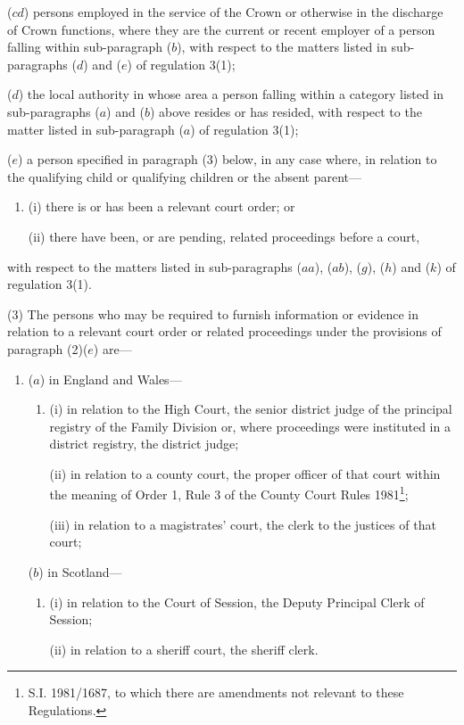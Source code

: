\documentclass[a4paper,12pt]{article}
\begin{document}
\begin{enumerate}
($cd$) persons employed in the service of the Crown or otherwise in the discharge of Crown functions, where they are the current or recent employer of a person falling within sub-paragraph ($b$), with respect to the matters listed in sub-paragraphs ($d$) and ($e$) of regulation 3(1);

($d$) the local authority in whose area a person falling within a category listed in sub-paragraphs ($a$) and ($b$) above resides or has resided, with respect to the matter listed in sub-paragraph ($a$) of regulation 3(1);

($e$) a person specified in paragraph (3) below, in any case where, in relation to the qualifying child or qualifying children or the absent parent—
\begin{enumerate}\item[]
(i) there is or has been a relevant court order; or

(ii) there have been, or are pending, related proceedings before a court,
\end{enumerate}
with respect to the matters listed in sub-paragraphs 
($aa$), ($ab$),  %
($g$), ($h$) and ($k$) of regulation 3(1).
\end{enumerate}

(3) The persons who may be required to furnish information or evidence in relation to a relevant court order or related proceedings under the provisions of paragraph (2)($e$) are—
\begin{enumerate}\item[]
($a$) in England and Wales—
\begin{enumerate}\item[]
(i) in relation to the High Court, the senior district judge of the principal registry of the Family Division or, where proceedings were instituted in a district registry, the district judge;

(ii) in relation to a county court, the proper officer of that court within the meaning of Order 1, Rule 3 of the County Court Rules 1981\footnote{\frenchspacing S.I. 1981/1687, to which there are amendments not relevant to these Regulations.};

(iii) in relation to a magistrates' court, the clerk to the justices of that court;
\end{enumerate}

($b$) in Scotland—
\begin{enumerate}\item[]
(i) in relation to the Court of Session, the Deputy Principal Clerk of Session;

(ii) in relation to a sheriff court, the sheriff clerk.
\end{enumerate}
\end{enumerate}
\end{document}
